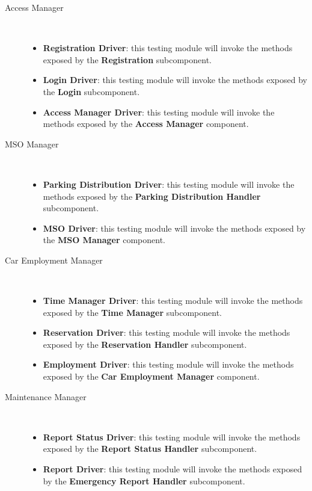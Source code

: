\begin{description}
		\item[Access Manager]~\\ 
			\begin{itemize}
				\item \textbf{Registration Driver}: this testing module will invoke the methods exposed by the \textbf{Registration} subcomponent.
				\item \textbf{Login Driver}: this testing module will invoke the methods exposed by the \textbf{Login} subcomponent.
				\item \textbf{Access Manager Driver}: this testing module will invoke the methods exposed by the \textbf{Access Manager} component.
			\end{itemize}
		\item[MSO Manager]~\\
			\begin{itemize}
				\item \textbf{Parking Distribution Driver}: this testing module will invoke the methods exposed by the \textbf{Parking Distribution Handler} subcomponent.
				\item \textbf{MSO Driver}: this testing module will invoke the methods exposed by the \textbf{MSO Manager} component.
			\end{itemize}
		\item[Car Employment Manager]~\\
			\begin{itemize}
				\item \textbf{Time Manager Driver}: this testing module will invoke the methods exposed by the \textbf{Time Manager} subcomponent.
				\item \textbf{Reservation Driver}: this testing module will invoke the methods exposed by the \textbf{Reservation Handler} subcomponent.
				\item \textbf{Employment Driver}: this testing module will invoke the methods exposed by the \textbf{Car Employment Manager} component.
			\end{itemize}
		\item[Maintenance Manager]~\\
			\begin{itemize}
				\item \textbf{Report Status Driver}: this testing module will invoke the methods exposed by the \textbf{Report Status Handler} subcomponent.
				\item \textbf{Report Driver}: this testing module will invoke the methods exposed by the \textbf{Emergency Report Handler} subcomponent.

\end{itemize}
\end{description}
